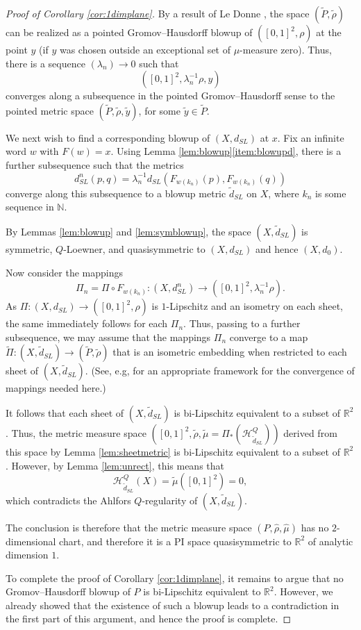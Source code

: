 \documentclass{amsart}
\theoremstyle{plain}
\theoremstyle{definition}
\numberwithin{equation}{section}
\numberwithin{theorem}{section}
\newcommand{\RR}{\mathbb{R}}
\begin{document}
\begin{proof}[Proof of Corollary \ref{cor:1dimplane}]
By a result of Le Donne \cite[Proposition 3.1]{LD}, the space $(\tilde{P},\tilde{\rho})$ can be realized as a pointed Gromov--Hausdorff blowup of $([0,1]^2, \rho)$ at the point $y$ (if $y$ was chosen outside an exceptional set of $\mu$-measure zero). Thus, there is a sequence $(\lambda_n)\rightarrow 0$ such that
$$ ([0,1]^2, \lambda_n^{-1} \rho, y)$$
converges along a subsequence in the pointed Gromov--Hausdorff sense to the pointed metric space $(\tilde{P}, \tilde{\rho}, \tilde{y})$, for some $\tilde{y}\in \tilde{P}.$

We next wish to find a corresponding blowup of $(X,d_{SL})$ at $x$. Fix an infinite word $w$ with $F(w)=x$. Using Lemma \ref{lem:blowup}\eqref{item:blowupd}, there is a further subsequence such that the metrics
$$ d^n_{SL}(p,q) = \lambda_n^{-1}d_{SL}(F_{w(k_n)}(p), F_{w(k_n)}(q))$$
converge along this subsequence to a blowup metric $\tilde{d}_{SL}$ on $X$, where $k_n$ is some sequence in $\mathbb{N}$. 

By Lemmas \ref{lem:blowup} and \ref{lem:symblowup}, the space $(X,\tilde{d}_{SL})$ is symmetric, $Q$-Loewner, and quasisymmetric to $(X,d_{SL})$ and hence $(X,d_0)$.

Now consider the mappings
$$ \Pi_n = \Pi \circ F_{w(k_n)}: (X,d^n_{SL}) \rightarrow ([0,1]^2, \lambda_n^{-1}\rho).$$
As $\Pi\colon (X,d_{SL})\rightarrow ([0,1]^2, \rho)$ is $1$-Lipschitz and an isometry on each sheet, the same immediately follows for each $\Pi_n$. Thus, passing to a further subsequence, we may assume that the mappings $\Pi_n$ converge to a map $\tilde{\Pi}\colon (X,\tilde{d}_{SL})\rightarrow (\tilde{P},\tilde{\rho})$ that is an isometric embedding when restricted to each sheet of $(X,\tilde{d}_{SL})$. (See, e.g, \cite[Ch. 8]{DS} for an appropriate framework for the convergence of mappings needed here.)

It follows that each sheet of  $(X,\tilde{d}_{SL})$ is bi-Lipschitz equivalent to a subset of $\mathbb{R}^2$. Thus, the metric measure space $([0,1]^2,\tilde{\rho},\tilde{\mu}=\Pi_{*}(\mathcal{H}^Q_{\tilde{d}_{SL}}))$ derived from this space by Lemma \ref{lem:sheetmetric} is bi-Lipschitz equivalent to a subset of $\RR^2$. However, by Lemma \ref{lem:unrect}, this means that 
$$ \mathcal{H}^Q_{\tilde{d}_{SL}}(X) = \tilde{\mu}([0,1]^2) = 0,$$
which contradicts the Ahlfors $Q$-regularity of $(X,\tilde{d}_{SL})$.

The conclusion is therefore that the metric measure space $(P,\hat{\rho},\hat{\mu})$ has no $2$-dimensional chart, and therefore it is a PI space quasisymmetric to $\RR^2$ of analytic dimension $1$.

To complete the proof of Corollary \ref{cor:1dimplane}, it remains to argue that no Gromov--Hausdorff blowup of $P$ is bi-Lipschitz equivalent to $\RR^2$. However, we already showed that the existence of such a blowup leads to a contradiction in the first part of this argument, and hence the proof is complete. 
\end{proof}
\end{document}
